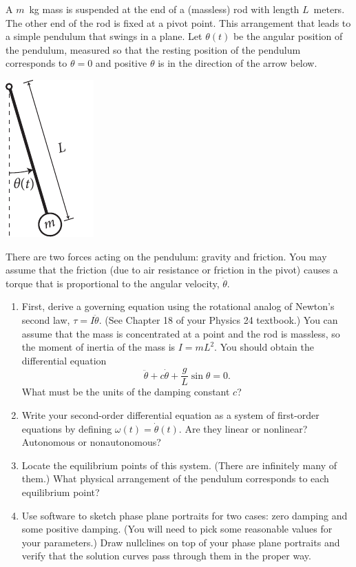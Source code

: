 \documentclass[12pt,letterpaper]{hmcpset}
\newcommand{\f}[2]{\frac{#1}{#2}}
\begin{document}
\begin{problem}[4]
    A $m$~kg mass is suspended at the end of a (massless) rod with
    length $L$~meters. The other end of the rod is fixed at a pivot
    point. This arrangement that leads to a simple pendulum that
    swings in a plane. Let $\theta(t)$ be the angular position of the
    pendulum, measured so that the resting position of the pendulum
    corresponds to $\theta=0$ and positive $\theta$ is in the
    direction of the arrow below.
    \begin{center}
        \includegraphics{img/june_1_4}
    \end{center}
    There are two forces acting on the pendulum: gravity and
    friction. You may assume that the friction (due to air resistance
    or friction in the pivot) causes a torque that is proportional to
    the angular velocity, $\dot{\theta}$.
    \begin{enumerate}
    \item First, derive a governing equation using the rotational
        analog of Newton's second law, $\tau=I\ddot{\theta}$.  (See
        Chapter 18 of your Physics 24 textbook.) You can assume that the
        mass is concentrated at a point and the rod is massless, so the
        moment of inertia of the mass is $I=mL^2$.  You should obtain
        the differential equation
        \[
            \ddot{\theta}+c\dot{\theta}+\f{g}{L}\sin\theta=0.
        \]
        What must be the units of the damping constant $c$?
    \item Write your second-order differential equation as a system of
        first-order equations by defining
        $\omega(t)=\dot{\theta}(t)$. Are they linear or nonlinear?
        Autonomous or nonautonomous?
    \item Locate the equilibrium points of this system. (There are
        infinitely many of them.)  What physical arrangement of the
        pendulum corresponds to each equilibrium point?
    \item Use software to sketch phase plane portraits for two cases:
        zero damping and some positive damping.  (You will need to pick
        some reasonable values for your parameters.)  Draw nullclines on
        top of your phase plane portraits and verify that the solution
        curves pass through them in the proper way.
\end{enumerate}
\end{problem}
\newpage
\begin{solution}
    \null\vfill
\end{solution}
\newpage
\end{document}

